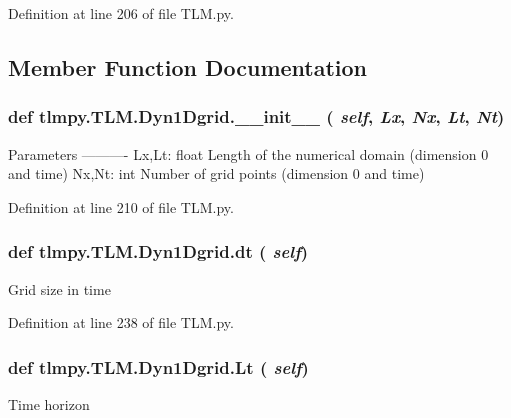 Definition at line 206 of file TLM.py.

\subsection{Member Function Documentation}
\hypertarget{classtlmpy_1_1TLM_1_1Dyn1Dgrid_adc2fc02634f11015d45db7bef02a91dc}{
\subsubsection[{\_\-\_\-init\_\-\_\-}]{\setlength{\rightskip}{0pt plus 5cm}def tlmpy.TLM.Dyn1Dgrid.\_\-\_\-init\_\-\_\- ( {\em self}, \/   {\em Lx}, \/   {\em Nx}, \/   {\em Lt}, \/   {\em Nt})}}
\label{classtlmpy_1_1TLM_1_1Dyn1Dgrid_adc2fc02634f11015d45db7bef02a91dc}
\begin{DoxyVerb}
Parameters
----------
Lx,Lt: float
    Length of the numerical domain (dimension 0 and time)
Nx,Nt: int
    Number of grid points (dimension 0 and time)
\end{DoxyVerb}
 

Definition at line 210 of file TLM.py.\hypertarget{classtlmpy_1_1TLM_1_1Dyn1Dgrid_a12e4d95aa90d62a64a73a91fe13e01d5}{
\subsubsection[{dt}]{\setlength{\rightskip}{0pt plus 5cm}def tlmpy.TLM.Dyn1Dgrid.dt ( {\em self})}}
\label{classtlmpy_1_1TLM_1_1Dyn1Dgrid_a12e4d95aa90d62a64a73a91fe13e01d5}
\begin{DoxyVerb}Grid size in time\end{DoxyVerb}
 

Definition at line 238 of file TLM.py.\hypertarget{classtlmpy_1_1TLM_1_1Dyn1Dgrid_ab59ce8bace49e4fb0affd9ed0ad6da52}{
\subsubsection[{Lt}]{\setlength{\rightskip}{0pt plus 5cm}def tlmpy.TLM.Dyn1Dgrid.Lt ( {\em self})}}
\label{classtlmpy_1_1TLM_1_1Dyn1Dgrid_ab59ce8bace49e4fb0affd9ed0ad6da52}
\begin{DoxyVerb}Time horizon\end{DoxyVerb}
 

